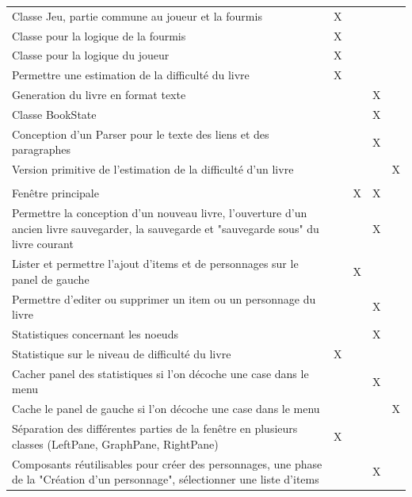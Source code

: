 \begin{centering}
\begin{longtable}{|p{8cm}|c|c|c|c|}
				\rowcolor{lightgray} \multicolumn{5}{|c|}{ \textbf{Jeu et export au format texte}}\\
				\hline
				Classe Jeu, partie commune au joueur et la fourmis& X & & & \\
				\hline
				Classe pour la logique de la fourmis& X & & & \\
				\hline
				Classe pour la logique du joueur & X & & & \\
				\hline
				Permettre une estimation de la difficulté du livre  & X & & & \\
				\hline
				Generation du livre en format texte & & & X & \\
				\hline
				Classe BookState & & & X & \\
				\hline
				Conception d'un Parser pour le texte des liens et des paragraphes & & & X & \\
				\hline
				Version primitive de l'estimation de la difficulté d'un livre& & & & X\\
				\hline

				\rowcolor{lightgray} \multicolumn{5}{|c|}{ \textbf{Fenêtre}}\\
				\hline
				Fenêtre principale & & X & X & \\
				\hline
				Permettre la conception d'un nouveau livre, l'ouverture d'un ancien livre sauvegarder, la sauvegarde et "sauvegarde sous" du livre courant & & & X & \\
				\hline
				Lister et permettre l'ajout d'items et de personnages sur le panel de gauche& & X & & \\
				\hline
				Permettre d'editer ou supprimer un item ou un personnage du livre & & & X & \\
				\hline
				Statistiques concernant les noeuds & & & X & \\
				\hline
				Statistique sur le niveau de difficulté du livre & X & & & \\
				\hline
				Cacher panel des statistiques si l'on décoche une case dans le menu & & & X & \\
				\hline
				Cache le panel de gauche si l'on décoche une case dans le menu& & & & X\\
				\hline
				Séparation des différentes parties de la fenêtre en plusieurs classes (LeftPane, GraphPane, RightPane) & X & & & \\
				\hline
				Composants réutilisables pour créer des personnages, une phase de la "Création d'un personnage", sélectionner une liste d'items & & & X & \\
				\hline


\end{longtable}
\end{centering}
